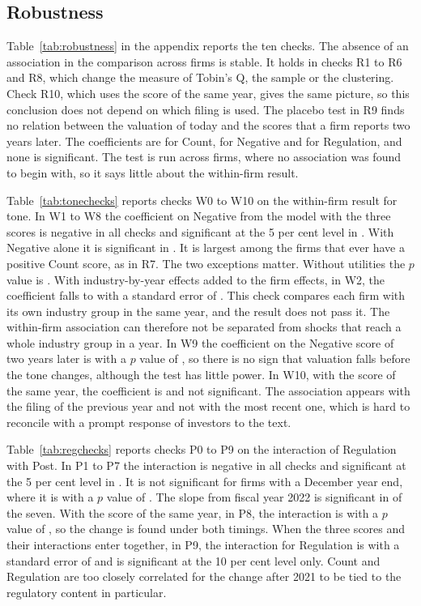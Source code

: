 \documentclass[12pt,a4paper]{article}
\begin{document}
\subsection{Robustness}

Table~\ref{tab:robustness} in the appendix reports the ten checks. The absence of an association in the comparison across firms is stable. It holds in checks R1 to R6 and R8, which change the measure of Tobin's Q, the sample or the clustering. Check R10, which uses the score of the same year, gives the same picture, so this conclusion does not depend on which filing is used. The placebo test in R9 finds no relation between the valuation of today and the scores that a firm reports two years later. The coefficients are \coefRNineCount{} for Count, \coefRNineNeg{} for Negative and \coefRNineReg{} for Regulation, and none is significant. The test is run across firms, where no association was found to begin with, so it says little about the within-firm result.

Table~\ref{tab:tonechecks} reports checks W0 to W10 on the within-firm result for tone. In W1 to W8 the coefficient on Negative from the model with the three scores is negative in all \nNegWJ{} checks and significant at the 5 per cent level in \nSigWJ{}. With Negative alone it is significant in \nSigWA{}. It is largest among the firms that ever have a positive Count score, as in R7. The two exceptions matter. Without utilities the $p$ value is \pvalWThreeJ{}. With industry-by-year effects added to the firm effects, in W2, the coefficient falls to \coefWTwoJ{} with a standard error of \seWTwoJ{}. This check compares each firm with its own industry group in the same year, and the result does not pass it. The within-firm association can therefore not be separated from shocks that reach a whole industry group in a year. In W9 the coefficient on the Negative score of two years later is \coefWNineLeadJ{} with a $p$ value of \pvalWNineLeadJ{}, so there is no sign that valuation falls before the tone changes, although the test has little power. In W10, with the score of the same year, the coefficient is \coefWTenJ{} and not significant. The association appears with the filing of the previous year and not with the most recent one, which is hard to reconcile with a prompt response of investors to the text.

Table~\ref{tab:regchecks} reports checks P0 to P9 on the interaction of Regulation with Post. In P1 to P7 the interaction is negative in all \nNegPIx{} checks and significant at the 5 per cent level in \nSigPIx{}. It is not significant for firms with a December year end, where it is \coefPFiveIx{} with a $p$ value of \pvalPFiveIx{}. The slope from fiscal year 2022 is significant in \nSigPSlope{} of the seven. With the score of the same year, in P8, the interaction is \coefPEightIx{} with a $p$ value of \pvalPEightIx{}, so the change is found under both timings. When the three scores and their interactions enter together, in P9, the interaction for Regulation is \coefPNineIx{} with a standard error of \sePNineIx{} and is significant at the 10 per cent level only. Count and Regulation are too closely correlated for the change after 2021 to be tied to the regulatory content in particular.
\end{document}
